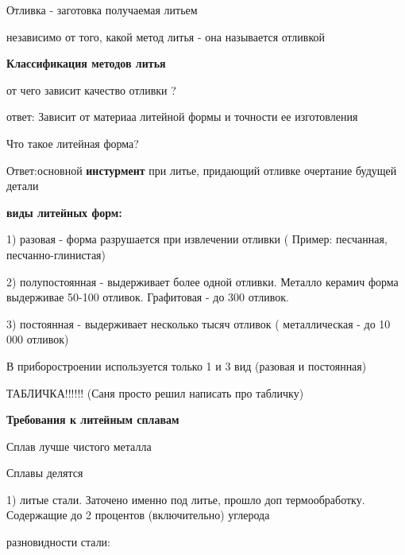{\begin{center}
    \par Отливка - заготовка получаемая литьем 

    \par независимо от того, какой метод литья - она называется отливкой

    \par \textbf{Классификация методов литья}

    \par от чего зависит качество отливки ?

    \par ответ: Зависит от материаа литейной формы и точности ее изготовления 

    \par Что такое литейная форма?

    \par Ответ:основной \textbf{инстурмент} при литье, придающий отливке очертание будущей детали

    \par \textbf{виды литейных форм:}

    \par 1) разовая - форма разрушается при извлечении отливки ( Пример: песчанная, песчанно-глинистая) 

    \par 2) полупостоянная - выдерживает более одной отливки. Металло керамич форма выдерживае 50-100 отливок. Графитовая - до 300 отливок.

    \par 3) постоянная - выдерживает несколько тысяч отливок ( металлическая - до 10 000 отливок) 

    \par В приборостроении используется только 1 и 3 вид (разовая и постоянная)

    \par ТАБЛИЧКА!!!!!! (Саня просто решил написать про табличку)

    \par \textbf{Требования к литейным сплавам}

    \par Сплав лучше чистого металла

    \par Сплавы делятся 

    \par 1) литые стали. Заточено именно под литье, прошло доп термообработку. Содержащие до 2 процентов (включительно) углерода

    \par разновидности стали:


\end{center}}
